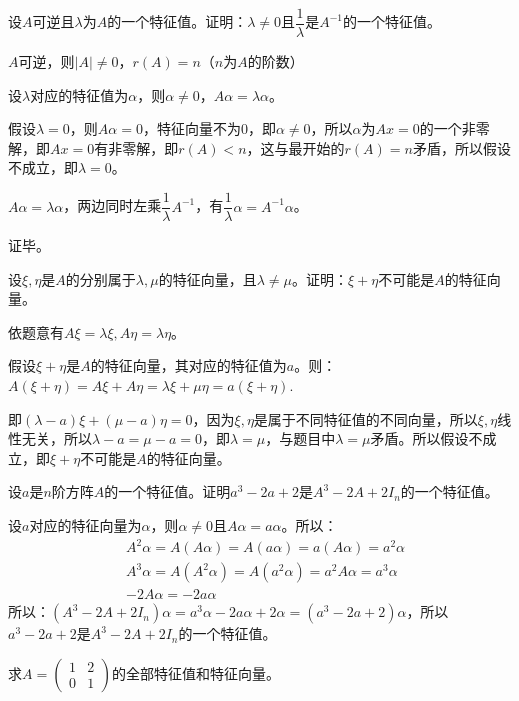 \documentclass[a4paper]{report}
\begin{document}
\EX 设$A$可逆且$\lambda$为$A$的一个特征值。证明：$\lambda\neq0$且$\dfrac{1}{\lambda}$是$A^{-1}$的一个特征值。

\begin{zhengming}
$A$可逆，则$|A|\neq 0$，$r(A)=n$（$n$为$A$的阶数）

设$\lambda$对应的特征值为$\alpha$，则$\alpha\neq 0$，$A\alpha =\lambda \alpha$。

假设$\lambda =0$，则$A\alpha=0$，特征向量不为0，即$\alpha\neq0$，所以$\alpha$为$Ax=0$的一个非零解，即$Ax=0$有非零解，即$r(A)< n$，这与最开始的$r(A)=n$矛盾，所以假设不成立，即$\lambda =0$。

$A\alpha=\lambda\alpha$，两边同时左乘$\dfrac{1}{\lambda}A^{-1}$，有$\dfrac{1}{\lambda}\alpha=A^{-1}\alpha$。

证毕。
\end{zhengming}

\EX 设$\xi,\eta$是$A$的分别属于$\lambda,\mu$的特征向量，且$\lambda\neq \mu$。证明：$\xi+\eta$不可能是$A$的特征向量。

\begin{zhengming}
依题意有$A\xi=\lambda\xi,A\eta=\lambda\eta$。

假设$\xi+\eta$是$A$的特征向量，其对应的特征值为$a$。则：$A(\xi+\eta)=A\xi+A\eta=\lambda\xi+\mu\eta=a(\xi+\eta)$.

即$(\lambda-a)\xi+(\mu-a)\eta=0$，因为$\xi,\eta$是属于不同特征值的不同向量，所以$\xi,\eta$线性无关，所以$\lambda-a=\mu-a=0$，即$\lambda=\mu$，与题目中$\lambda=\mu$矛盾。所以假设不成立，即$\xi+\eta$不可能是$A$的特征向量。
\end{zhengming}

\EX 设$a$是$n$阶方阵$A$的一个特征值。证明$a^3-2a+2$是$A^3-2A+2I_n$的一个特征值。

\begin{zhengming}
设$a$对应的特征向量为$\alpha$，则$\alpha\neq 0$且$A\alpha=a\alpha$。所以：
\begin{align*}
&A^2\alpha=A(A\alpha)=A(a\alpha)=a(A\alpha)=a^2\alpha\\
&A^3\alpha=A(A^2\alpha)=A(a^2\alpha)=a^2A\alpha=a^3\alpha\\
&-2A\alpha=-2a\alpha
\end{align*}
所以：$(A^3-2A+2I_n)\alpha=a^3\alpha-2a\alpha+2\alpha=(a^3-2a+2)\alpha$，所以$a^3-2a+2$是$A^3-2A+2I_n$的一个特征值。
\end{zhengming}

\EX 求$A=
\begin{pmatrix}
1&2\\0&1
\end{pmatrix}
$的全部特征值和特征向量。
\end{document}
